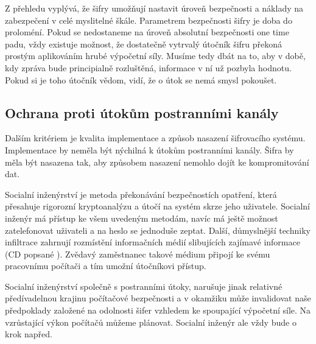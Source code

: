\documentclass[12pt]{article}
\begin{document}

Z přehledu vyplývá, že šifry umožňují nastavit úroveň bezpečnosti a náklady na zabezpečení v celé myslitelné škále. Parametrem bezpečnosti šifry je doba do proloméní. Pokud se nedostaneme na úroveň absolutní bezpečnosti one time padu, vždy existuje možnost, že dostatečně vytrvalý útočník šifru překoná prostým aplikováním hrubé výpočetní síly. Musíme tedy dbát na to, aby v době, kdy zpráva bude principialně rozluštěná, informace v ní už pozbyla hodnotu. Pokud si je toho útočník vědom, vidí, že o útok se nemá smysl pokoušet.

\subsection*{Ochrana proti útokům postranními kanály}

Dalším kritériem je kvalita implementace a způsob nasazení šifrovacího systému. Implementace by neměla být nýchilná k útokům postranními kanály. Šifra by měla být nasazena tak, aby způsobem nasazení nemohlo dojít ke kompromitování dat.

Socialní inženýrství je metoda překonávání bezpečnostích opatření, která přesahuje rigorozní kryptoanalýzu a útočí na systém skrze jeho uživatele. Socialní inženýr má přístup ke všem uvedeným metodám, navíc má ještě možnost zatelefonovat uživateli a na heslo se jednoduše zeptat. Další, důmyslnější techniky infiltrace zahrnují rozmístění informačních médií slibujících zajímavé informace
(CD popsané ). Zvědavý zaměstnanec takové médium připojí ke svému pracovnímu počítači a tím umožní útočníkovi přístup.

Socialní inženýrství společně s postranními útoky, narušuje jinak relativné předívadelnou krajinu počítačové bezpečnosti a v okamžiku může invalidovat naše předpoklady založené na odolnosti šifer vzhledem ke spoupající výpočetní síle. Na vzrůstající výkon počítačů můžeme plánovat. Socialní inženýr ale vždy bude o krok napřed.
\end{document}
